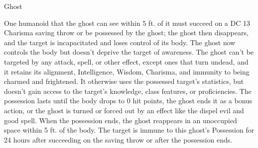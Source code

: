 \begin{monsterbox}{Ghost}
\begin{monsteraction}
\end{monsteraction}
\begin{monsteraction}
One humanoid that the ghost can see within 5 ft. of it must succeed on a DC 13 Charisma saving throw or be possessed by the ghost; the ghost then disappears, and the target is incapacitated and loses control of its body. The ghost now controls the body but doesn't deprive the target of awareness. The ghost can't be targeted by any attack, spell, or other effect, except ones that turn undead, and it retains its alignment, Intelligence, Wisdom, Charisma, and immunity to being charmed and frightened. It otherwise uses the possessed target's statistics, but doesn't gain access to the target's knowledge, class features, or proficiencies.
The possession lasts until the body drops to 0 hit points, the ghost ends it as a bonus action, or the ghost is turned or forced out by an effect like the dispel evil and good spell. When the possession ends, the ghost reappears in an unoccupied space within 5 ft. of the body. The target is immune to this ghost's Possession for 24 hours after succeeding on the saving throw or after the possession ends.
\end{monsteraction}
\end{monsterbox}
